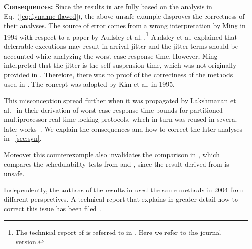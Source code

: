 
{\bf Consequences:} Since the results in \cite{ECRTS-AudsleyB04,RTAS-AudsleyB04,RTCSA-KimCPKH95,MingLiRTCSA1994} are fully based on the analysis in Eq.~(\ref{eq:dynamic-flawed}), the above unsafe example disproves the correctness of their analyses. The source of error comes from a wrong interpretation by Ming \cite{MingLiRTCSA1994} in 1994 with respect to a paper by Audsley et al. \cite{audsley-1993}.\footnote{The technical report of \cite{audsley-1993} is referred to in \cite{MingLiRTCSA1994}. Here we refer to the journal version.} Audsley et al. \cite{audsley-1993} explained that deferrable executions may result in arrival jitter and the jitter terms should be accounted while analyzing the worst-case response time. However, Ming \cite{MingLiRTCSA1994} interpreted that the jitter is the self-suspension time, which was not originally provided in \cite{audsley-1993}. Therefore, there was no proof of the correctness of the methods used in \cite{MingLiRTCSA1994}. The concept was adopted by Kim et al. \cite{RTCSA-KimCPKH95} in 1995. 

This misconception spread further when it was propagated by Lakshmanan et al.~\cite{lakshmanan-2009} in their derivation of worst-case response time bounds for
partitioned multiprocessor real-time locking protocols, which in turn was reused in several later works~\cite{zeng-2011,bbb-2013,yang-2013,kim-2014,han-2014,carminati-2014,yang-2014}. We explain the consequences and how to correct the later analyses in \mysectionref{}~\ref{sec:syn}. 
 
Moreover this counterexample also invalidates the comparison in \cite{RidouardR06}, which compares the schedulability tests from \cite{RTCSA-KimCPKH95} and \cite[Page 164-165]{Liu:2000:RS:518501}, since the result derived from \cite{RTCSA-KimCPKH95} is unsafe.

Independently, the authors of the results in \cite{ECRTS-AudsleyB04,RTAS-AudsleyB04} used the same methods in 2004 from different perspectives. A technical report that explains in greater detail how to correct this issue has been filed~\cite{BletsasReport2015}. 

